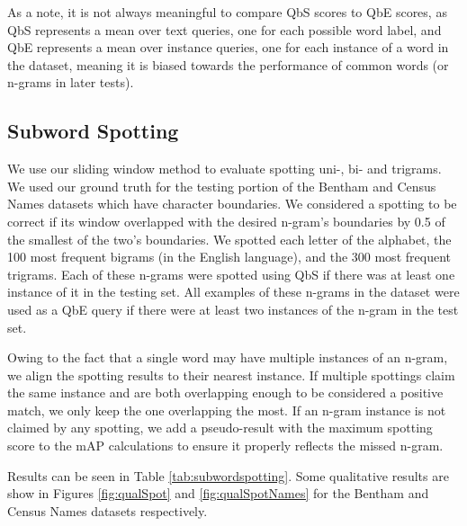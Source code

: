 \documentclass[ms,electronic,twosidetoc,letterpaper,chaptercenter,parttop,lof,lot]{byumsphd}
\begin{document}
As a note, it is not always meaningful to compare QbS scores to QbE scores, as QbS represents a mean over text queries, one for each possible word label, and QbE represents a mean over instance queries, one for each instance of a word in the dataset, meaning it is biased towards the performance of common words (or n-grams in later tests).

\subsection{Subword Spotting}

We use our sliding window method to evaluate spotting uni-, bi- and trigrams. We used our ground truth for the testing portion of the Bentham and Census Names datasets which have character boundaries. We considered a spotting to be correct if its window overlapped with the desired n-gram's boundaries by 0.5 of the smallest of the two's boundaries.
We spotted each letter of the alphabet, the 100 most frequent bigrams (in the English language), and the 300 most frequent trigrams. Each of these n-grams were spotted using QbS if there was at least one instance of it in the testing set. All examples of these n-grams in the dataset were used as a QbE query if there were at least two instances of the n-gram in the test set.

Owing to the fact that a single word may have multiple instances of an n-gram, we align the spotting results to their nearest instance. If multiple spottings claim the same instance and are both overlapping enough to be considered a positive match, we only keep the one overlapping the most.
If an n-gram instance is not claimed by any spotting, we add a pseudo-result with the maximum spotting score to the mAP calculations to ensure it properly reflects the missed n-gram.

Results can be seen in Table \ref{tab:subwordspotting}.
Some qualitative results are show in Figures \ref{fig:qualSpot} and \ref{fig:qualSpotNames} for the Bentham and Census Names datasets respectively.


\end{document}
